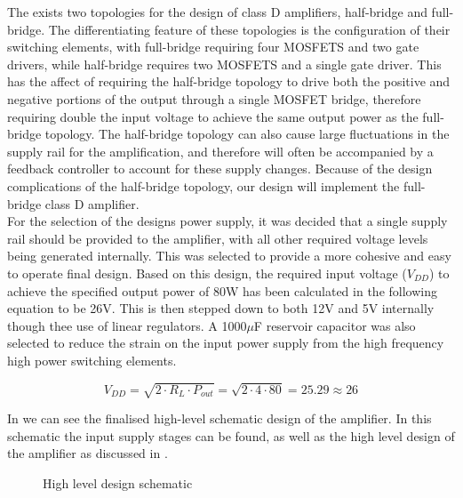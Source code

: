 \documentclass[a4paper,11pt]{article}
\begin{document}
The exists two topologies for the design of class D amplifiers, half-bridge and full-bridge. The differentiating feature of these topologies is the configuration of their switching elements, with full-bridge requiring four MOSFETS and two gate drivers, while half-bridge requires two MOSFETS and a single gate driver. This has the affect of requiring the half-bridge topology to drive both the positive and negative portions of the output through a single MOSFET bridge, therefore requiring double the input voltage to achieve the same output power as the full-bridge topology. The half-bridge topology can also cause large fluctuations in the supply rail for the amplification, and therefore will often be accompanied by a feedback controller to account for these supply changes. Because of the design complications of the half-bridge topology, our design will implement the full-bridge class D amplifier.\\

For the selection of the designs power supply, it was decided that a single supply rail should be provided to the amplifier, with all other required voltage levels being generated internally. This was selected to provide a more cohesive and easy to operate final design. Based on this design, the required input voltage ($V_{DD}$) to achieve the specified output power of 80W has been calculated in the following equation to be 26V. This is then stepped down to both 12V and 5V internally though thee use of linear regulators. A 1000$\mu$F reservoir capacitor was also selected to reduce the strain on the input power supply from the high frequency high power switching elements.

$$ V_{DD} = \sqrt{2\cdot R_L \cdot P_{out}} = \sqrt{2\cdot 4 \cdot 80} = 25.29 \approx 26$$

In  we can see the finalised high-level schematic design of the amplifier. In this schematic the input supply stages can be found, as well as the high level design of the amplifier as discussed in . 

\begin{figure}[h!]
    \centering
    \caption{High level design schematic}
    \label{F:design_schemtaic}
\end{figure}
\end{document}
